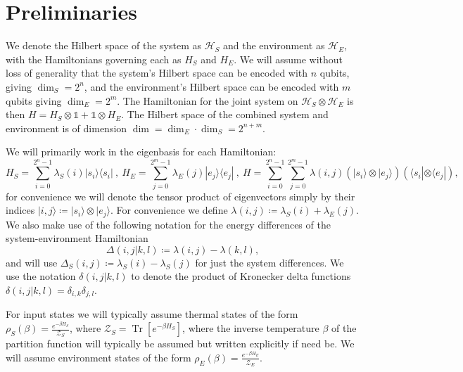 \documentclass{article}
\newcommand{\ket}[1]{|#1\rangle}
\newcommand{\bra}[1]{\langle #1|}
\newcommand{\ketbra}[2]{| #1\rangle\! \langle #2|}
\newcommand{\brackets}[1]{\left[ #1 \right]}
\DeclareMathOperator{\Tr}{Tr}
\newcommand{\trace}[1]{\Tr \brackets{ #1 }}
\newcommand{\hilb}{\mathcal{H}}
\newcommand{\partfun}{\mathcal{Z}}
\newcommand{\identity}{\mathds{1}}
\begin{document}
\section{Preliminaries}
We denote the Hilbert space of the system as $\hilb_{S}$ and the environment as $\hilb_{E}$, with the Hamiltonians governing each as $H_{S}$ and $H_{E}$. We will assume without loss of generality that the system's Hilbert space can be encoded with $n$ qubits, giving $\dim_S = 2^{n}$, and the environment's Hilbert space can be encoded with $m$ qubits giving $\dim_E = 2^{m}$. The Hamiltonian for the joint system on $\hilb_{S} \otimes \hilb_{E}$ is then $H = H_{S} \otimes \identity + \identity \otimes H_{E}$. The Hilbert space of the combined system and environment is of dimension $\dim = \dim_E \cdot \dim_S = 2^{n + m}$. 

We will primarily work in the eigenbasis for each Hamiltonian:
\begin{equation}
    H_{S} = \sum_{i = 0}^{2^n - 1} \lambda_S(i) \ketbra{s_i}{s_i} ~,~ H_{E} = \sum_{j=0}^{2^m - 1} \lambda_E(j) \ketbra{e_j}{e_j} ~,~ H = \sum_{i=0}^{2^n - 1} \sum_{j=0}^{2^m - 1} \lambda(i,j) (\ket{s_i} \otimes \ket{e_j})(\bra{s_i} \otimes \bra{e_j}),
\end{equation}
for convenience we will denote the tensor product of eigenvectors simply by their indices $\ket{i,j} \coloneqq \ket{s_i} \otimes \ket{e_j}$. For convenience we define $\lambda(i,j) \coloneqq \lambda_S(i) + \lambda_E(j)$. We also make use of the following notation for the energy differences of the system-environment Hamiltonian
$$\Delta(i,j|k,l) \coloneqq \lambda(i,j) - \lambda(k,l),$$
and will use $\Delta_S(i,j) \coloneqq \lambda_S(i) - \lambda_S(j)$ for just the system differences. We use the notation $\delta(i,j|k,l)$ to denote the product of Kronecker delta functions $\delta(i,j|k,l) = \delta_{i,k} \delta_{j,l}$.

For input states we will typically assume thermal states of the form $\rho_S(\beta) = \frac{e^{-\beta H_S}}{\partfun_S}$, where $\partfun_S = \trace{e^{-\beta H_S}}$, where the inverse temperature $\beta$ of the partition function will typically be assumed but written explicitly if need be. We will assume environment states of the form $\rho_E(\beta) = \frac{e^{-\beta H_E}}{\partfun_E}$.
\end{document}
